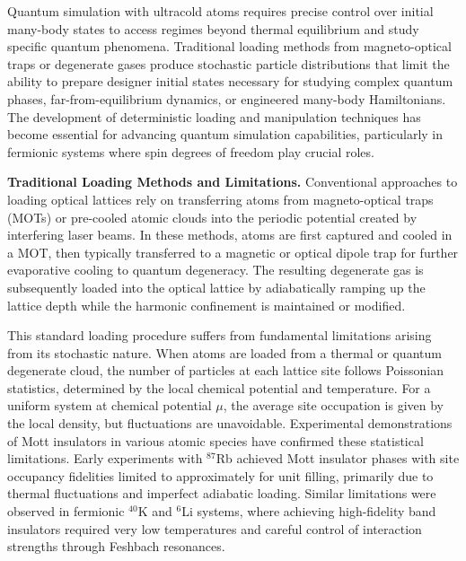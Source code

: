 

Quantum simulation with ultracold atoms requires precise control over initial many-body states to access regimes beyond thermal equilibrium and study specific quantum phenomena. Traditional loading methods from magneto-optical traps or degenerate gases produce stochastic particle distributions that limit the ability to prepare designer initial states necessary for studying complex quantum phases, far-from-equilibrium dynamics, or engineered many-body Hamiltonians. The development of deterministic loading and manipulation techniques has become essential for advancing quantum simulation capabilities, particularly in fermionic systems where spin degrees of freedom play crucial roles.

\textbf{Traditional Loading Methods and Limitations.} 
Conventional approaches to loading optical lattices rely on transferring atoms from magneto-optical traps (MOTs) or pre-cooled atomic clouds into the periodic potential created by interfering laser beams. In these methods, atoms are first captured and cooled in a MOT, then typically transferred to a magnetic or optical dipole trap for further evaporative cooling to quantum degeneracy. The resulting degenerate gas is subsequently loaded into the optical lattice by adiabatically ramping up the lattice depth while the harmonic confinement is maintained or modified.

This standard loading procedure suffers from fundamental limitations arising from its stochastic nature. When atoms are loaded from a thermal or quantum degenerate cloud, the number of particles at each lattice site follows Poissonian statistics, determined by the local chemical potential and temperature. For a uniform system at chemical potential $\mu$, the average site occupation is given by the local density, but fluctuations are unavoidable. Experimental demonstrations of Mott insulators in various atomic species have confirmed these statistical limitations. Early experiments with $^{87}$Rb achieved Mott insulator phases with site occupancy fidelities limited to approximately  for unit filling, primarily due to thermal fluctuations and imperfect adiabatic loading. Similar limitations were observed in fermionic $^{40}$K and $^6$Li systems, where achieving high-fidelity band insulators required very low temperatures and careful control of interaction strengths through Feshbach resonances.


